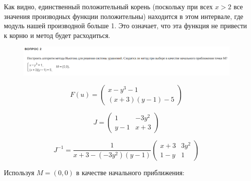 \documentclass[varwidth,margin=1in]{standalone}
\begin{document}
Как видно, единственный положительный корень (поскольку при всех \(x>2\) все значения производных функции положительны) находится в этом интервале, где модуль нашей производной больше 1. Это означает, что эта функция не привести к корню и метод будет расходиться.

\begin{figure}[h!]
    \centering
    \includegraphics*[width=\linewidth]{q2.png}
\end{figure}

\[F(u)=
    \left(
    \begin{matrix}
            x-y^3-1 \\
            (x+3)(y-1)-5
        \end{matrix}
    \right)
\]

\[J=
    \left(
    \begin{matrix}
            1   & -3y^2 \\
            y-1 & x+3
        \end{matrix}
    \right)
\]

\[J^{-1}=
    \frac{1}{x+3-(-3y^2)(y-1)}
    \left(
    \begin{matrix}
            x+3 & 3y^2 \\
            1-y & 1
        \end{matrix}
    \right)
\]

Используя \(M=(0,0)\) в качестве начального приближения:
\end{document}
